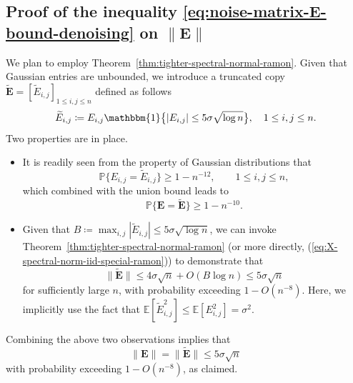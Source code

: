 \subsection{Proof of the inequality \eqref{eq:noise-matrix-E-bound-denoising} on $\|\bm{E}\|$}
\label{sec:proof-eqn-noise-matrix-E-bound-denoising}

We plan to employ Theorem~\ref{thm:tighter-spectral-normal-ramon}.
Given that Gaussian entries are unbounded, we introduce a truncated copy $\widetilde{\bm{E}}=[\widetilde{E}_{i,j}]_{1\leq i,j\leq n}$ defined as follows
%
\begin{equation}
	\widetilde{E}_{i,j}\coloneqq E_{i,j} \mathbbm{1}\big\{|E_{i,j}|\leq 5\sigma\sqrt{\log n}\big\}, \quad 1\leq i,j\leq n.
	\label{eq:defn-Eij-truncated-denoising}
\end{equation}
%
Two properties are in place.
\begin{itemize}
\item It is readily seen from the property of Gaussian distributions
that
\[
\mathbb{P}\big\{ E_{i,j}=\widetilde{E}_{i,j}\big\}\geq1-n^{-12},\qquad1\leq i,j\leq n,
\]
which combined with the union bound leads to
\begin{equation}
\mathbb{P}\big\{\bm{E}=\widetilde{\bm{E}}\big\}\geq1-n^{-10}.\label{eq:prob-E-Etilde-equivalence-denoising}
\end{equation}
\item Given that $B\coloneqq\max_{i,j}|\widetilde{E}_{i,j}|\leq 5\sigma\sqrt{\log n}$,
we can invoke Theorem~\ref{thm:tighter-spectral-normal-ramon} (or more directly,
(\ref{eq:X-spectral-norm-iid-special-ramon})) to demonstrate that
\[
\|\widetilde{\bm{E}}\|\leq4\sigma\sqrt{n}+O(B\log n)\leq5\sigma\sqrt{n}
\]
for sufficiently large $n$, 
with probability exceeding $1-O(n^{-8})$. Here, we implicitly use the fact that $\mathbb{E}[\widetilde{{E}}_{i,j}^2] \leq \mathbb{E}[E_{i,j}^2 ] = \sigma^2$.
\end{itemize}
Combining the above two observations implies that
%
\[
\|\bm{E}\|=\|\widetilde{\bm{E}}\|\leq5\sigma\sqrt{n}
\]
%
 with probability exceeding $1-O(n^{-8})$, as claimed.





